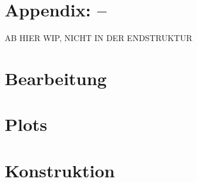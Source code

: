 \documentclass[parskip, twoside, accentcolor=tud9b, colorback, breaklinks, noresetcounter, noheadingspace, pdfencoding=unicode, 11pt, bigchapter, numbersubsubsec, numbers=noenddot, linedtoc, longdoc]{tudreport}
\begin{document}
	
\pagestyle{plain}
\appendix
\newcommand{\hiddensection}[1]{
    \stepcounter{section}
    \section*{\Alph{chapter}.\arabic{section}\hspace{0.8em}{#1}}
}
\chapter{Appendix: --}
%    



\newpage
{\Huge AB HIER WIP, NICHT IN DER ENDSTRUKTUR}
\newpage
    
\chapter{Bearbeitung}
    
    
    

\chapter{Plots}
	
	
\chapter{Konstruktion}
	
	
	
	
	
\cleardoublepage


%
\cleardoublepage

\listoffigures
\cleardoublepage

\listoftables
\cleardoublepage
\end{document}

